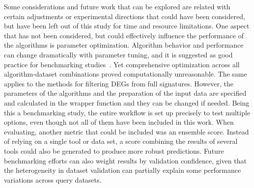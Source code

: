 Some considerations and future work that can be explored are related with certain adjustments or experimental directions that could have been considered, but have been left out of this study for time and resource limitations. 
One aspect that has not been considered, but could effectively influence the performance of the algorithms is parameter optimization. 
Algorithm behavior and performance can change dramatically with parameter tuning, and it is suggested as good practice for benchmarking studies~\cite{RN108}. 
Yet comprehensive optimization across all algorithm-dataset combinations proved computationally unreasonable. 
The same applies to the methods for filtering \gls{DEGs} from full signatures. 
However, the parameters of the algorithms and the preparation of the input data are specified and calculated in the wrapper function and they can be changed if needed. 
Being this a benchmarking study, the entire workflow is set up precisely to test multiple options, even though not all of them have been included in this work. 
When evaluating, another metric that could be included was an ensemble score. 
Instead of relying on a single tool or data set, a score combining the results of several tools could also be generated to produce more robust predictions. 
Future benchmarking efforts can also weight results by validation confidence, given that the heterogeneity in dataset validation can partially explain some performance variations across query datasets.

